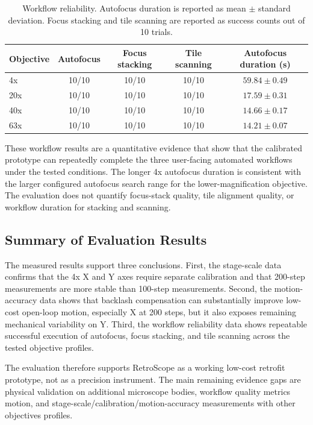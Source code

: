 \begin{table}[H]
    \centering
    \caption[Workflow reliability summary]{Workflow reliability. Autofocus duration is reported as mean $\pm$ standard deviation. Focus stacking and tile scanning are reported as success counts out of 10 trials.}
    \label{tab:workflow}
    \begin{tabular}{@{}l c c c c@{}}
        \toprule
        \textbf{Objective} & \textbf{Autofocus} & \textbf{Focus stacking} &
        \textbf{Tile scanning} & \textbf{Autofocus duration (s)} \\
        \midrule
        4x  & 10/10 & 10/10 & 10/10 & $59.84 \pm 0.49$ \\
        20x & 10/10 & 10/10 & 10/10 & $17.59 \pm 0.31$ \\
        40x & 10/10 & 10/10 & 10/10 & $14.66 \pm 0.17$ \\
        63x & 10/10 & 10/10 & 10/10 & $14.21 \pm 0.07$ \\
        \bottomrule
    \end{tabular}
\end{table}

These workflow results are a quantitative evidence that show that the calibrated prototype can repeatedly complete the three user-facing automated workflows under the tested conditions. The longer 4x autofocus duration is consistent with the larger configured autofocus search range for the lower-magnification objective. The evaluation does not quantify focus-stack quality, tile alignment quality, or workflow duration for stacking and scanning.

\subsection{Summary of Evaluation Results}

The measured results support three conclusions. First, the stage-scale data confirms that the 4x X and Y axes require separate calibration and that 200-step measurements are more stable than 100-step measurements. Second, the motion-accuracy data shows that backlash compensation can substantially improve low-cost open-loop motion, especially X at 200 steps, but it also exposes remaining mechanical variability on Y. Third, the workflow reliability data shows repeatable successful execution of autofocus, focus stacking, and tile scanning across the tested objective profiles.

The evaluation therefore supports RetroScope as a working low-cost retrofit prototype, not as a precision instrument. The main remaining evidence gaps are physical validation on additional microscope bodies, workflow quality metrics motion, and stage-scale/calibration/motion-accuracy measurements with other objectives profiles.
